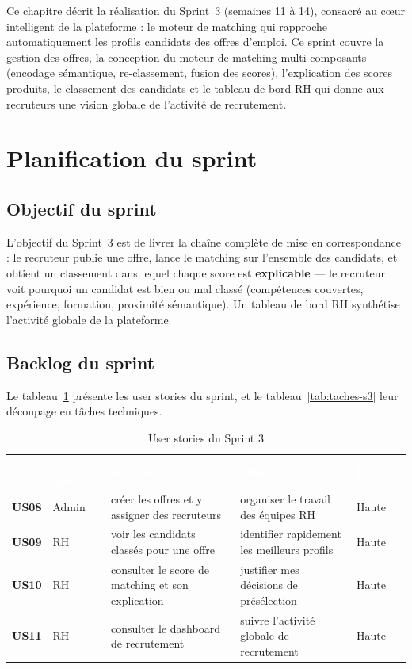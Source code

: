 \documentclass[12pt,a4paper]{report}
\begin{document}
Ce chapitre décrit la réalisation du Sprint~3 (semaines 11 à 14), consacré au c\oe ur intelligent de la plateforme : le moteur de matching qui rapproche automatiquement les profils candidats des offres d'emploi. Ce sprint couvre la gestion des offres, la conception du moteur de matching multi-composants (encodage sémantique, re-classement, fusion des scores), l'explication des scores produits, le classement des candidats et le tableau de bord RH qui donne aux recruteurs une vision globale de l'activité de recrutement.

\section{Planification du sprint}

\subsection{Objectif du sprint}

L'objectif du Sprint~3 est de livrer la chaîne complète de mise en correspondance : le recruteur publie une offre, lance le matching sur l'ensemble des candidats, et obtient un classement dans lequel chaque score est \textbf{explicable} --- le recruteur voit pourquoi un candidat est bien ou mal classé (compétences couvertes, expérience, formation, proximité sémantique). Un tableau de bord RH synthétise l'activité globale de la plateforme.

\subsection{Backlog du sprint}

Le tableau~\ref{tab:backlog-s3} présente les user stories du sprint, et le tableau~\ref{tab:taches-s3} leur découpage en tâches techniques.

\begin{table}[H]
\centering
\caption{User stories du Sprint 3}
\label{tab:backlog-s3}
\small
\begin{tabularx}{\textwidth}{>{\bfseries}p{0.9cm} p{1.9cm} X X p{1.4cm}}
\rowcolor{tabheader}
\textcolor{white}{\textbf{ID}} & \textcolor{white}{\textbf{En tant que\ldots}} & \textcolor{white}{\textbf{Je veux\ldots}} & \textcolor{white}{\textbf{Afin de\ldots}} & \textcolor{white}{\textbf{Priorité}} \\
US08 & Admin & créer les offres et y assigner des recruteurs & organiser le travail des équipes RH & Haute \\
\rowcolor{tabalt}
US09 & RH & voir les candidats classés pour une offre & identifier rapidement les meilleurs profils & Haute \\
US10 & RH & consulter le score de matching et son explication & justifier mes décisions de présélection & Haute \\
\rowcolor{tabalt}
US11 & RH & consulter le dashboard de recrutement & suivre l'activité globale de recrutement & Haute \\
\bottomrule
\end{tabularx}
\end{table}
\end{document}
